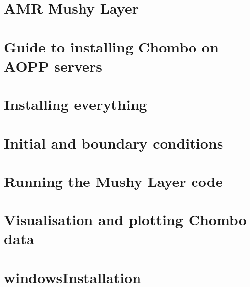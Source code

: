 \usepackage{amssymb, amsmath, mathrsfs, bm, mathtools}

\chapter{A\+MR Mushy Layer}
\label{index}\hypertarget{index}{}
\chapter{Guide to installing Chombo on A\+O\+PP servers}
\label{md__home_parkinsonjl_mushy-layer_doc__chombo_install_a_o_p_p}

\chapter{Installing everything}
\label{md__home_parkinsonjl_mushy-layer_doc__chombo_installation_guide}

\chapter{Initial and boundary conditions}
\label{md__home_parkinsonjl_mushy-layer_doc__initial_and_boundary_conditions}

\chapter{Running the Mushy Layer code}
\label{md__home_parkinsonjl_mushy-layer_doc__running_the_mushy_layer_code}

\chapter{Visualisation and plotting Chombo data}
\label{md__home_parkinsonjl_mushy-layer_doc__visualisation_and_plotting}

\chapter{windows\+Installation}
\label{md__home_parkinsonjl_mushy-layer_doc_windows_installation}

